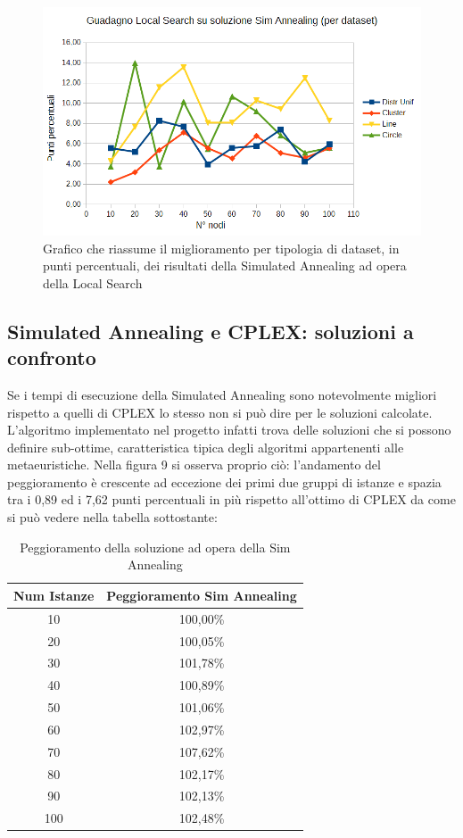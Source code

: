 \documentclass[preprint,12pt]{elsarticle}
\begin{document}
\begin{figure}[htbp]
\centering
\includegraphics[scale=0.50]{grafici_confronti/guadagno_LS.png} 
\caption{Grafico che riassume il miglioramento per tipologia di dataset, in punti percentuali, dei risultati della Simulated Annealing ad opera della Local Search}\label{fig:8}
\end{figure}

\subsection{\textbf{Simulated Annealing e CPLEX: soluzioni a confronto}}

Se i tempi di esecuzione della Simulated Annealing sono notevolmente migliori rispetto a quelli di CPLEX lo stesso non si può dire per le soluzioni calcolate. L'algoritmo implementato nel progetto infatti trova delle soluzioni che si possono definire sub-ottime, caratteristica tipica degli algoritmi appartenenti alle metaeuristiche. Nella figura 9 si osserva proprio ciò: l'andamento del peggioramento è crescente ad eccezione dei primi due gruppi di istanze e spazia tra i 0,89 ed i 7,62 punti percentuali in più rispetto all'ottimo di CPLEX da come si può vedere nella tabella sottostante: 

\begin{table}[htbp]
\caption {Peggioramento della soluzione ad opera della Sim Annealing} \label{tab:title} 
\begin{center}
\begin{tabular}{|c|c|}
\hline 
Num Istanze & Peggioramento Sim Annealing \\ 
\hline 
10 & 100,00\% \\ 
\hline 
20 & 100,05\% \\ 
\hline 
30 & 101,78\% \\ 
\hline 
40 & 100,89\% \\ 
\hline 
50 & 101,06\% \\ 
\hline 
60 & 102,97\% \\ 
\hline 
70 & 107,62\% \\ 
\hline 
80 & 102,17\% \\ 
\hline 
90 & 102,13\% \\ 
\hline 
100 & 102,48\% \\ 
\hline 
\end{tabular} 
\end{center}
\end{table}
\end{document}
